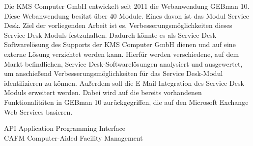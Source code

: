 \documentclass[fontsize=12pt]{scrartcl}
\begin{document}
\noindent
Die KMS Computer GmbH entwickelt seit 2011 die Webanwendung GEBman 10. Diese Webanwendung besitzt über 40 Module. Eines davon ist das Modul Service Desk. Ziel der vorliegenden Arbeit ist es, Verbesserungsmöglichkeiten dieses Service Desk-Moduls festzuhalten. Dadurch könnte es als Service Desk-Softwarelösung des Supports der KMS Computer GmbH dienen und auf eine externe Lösung verzichtet werden kann. Hierfür werden verschiedene, auf dem Markt befindlichen, Service Desk-Softwarelösungen analysiert und ausgewertet, um anschießend Verbesserungsmöglichkeiten für das Service Desk-Modul identifizieren zu können.\newline
Außerdem soll die E-Mail Integration des Service Desk-Moduls erweitert werden. Dabei wird auf die bereits vorhandenen Funktionalitäten in GEBman 10 zurückgegriffen, die auf den Microsoft Exchange Web Services basieren.

\newpage

\vspace*{-1cm}
\setcounter{page}{4}
\tableofcontents
\newpage

\vspace*{-1cm}
\begin{spacing}{1.8}
\listoffigures
\end{spacing}
\newpage


\noindent
API \tabto{4cm} Application Programming Interface\\

\noindent
CAFM \tabto{4cm} Computer-Aided Facility Management\\
\end{document}
